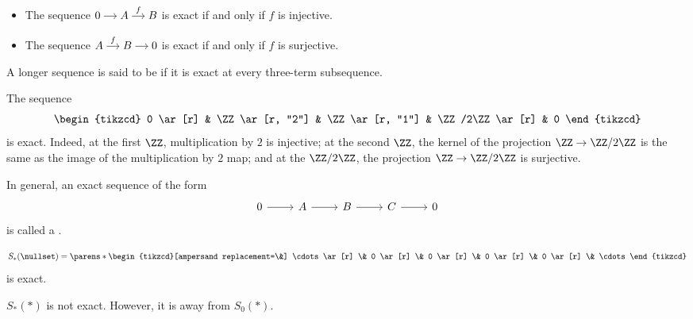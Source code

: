 \documentclass{standalone}
\begin{document}
\begin{example}
  \begin{itemize}[nosep]
    \item The sequence
      \(
        \begin{tikzcd}[cramped, sep=small]
          0 \ar[r] &
          A \ar[r, "f"] &
          B
        \end{tikzcd}
      \)
      is exact if and only if \(f\) is injective.
    \item The sequence
      \(
        \begin{tikzcd}[cramped, sep=small]
          A \ar[r, "f"] &
          B \ar[r] &
          0
        \end{tikzcd}
      \)
      is exact if and only if \(f\) is surjective.
  \end{itemize}
\end{example}

\begin{definition}
  A longer sequence is said to be  if it is exact at every
  three-term subsequence.
\end{definition}

\begin{example}
  The sequence
  \[
    \begin{tikzcd}
      0 \ar[r] &
      \ZZ \ar[r, "2"] &
      \ZZ \ar[r, "1"] &
      \ZZ/2\ZZ \ar[r] &
      0
    \end{tikzcd}
  \]
  is exact. Indeed, at the first \(\ZZ\), multiplication by \(2\) is injective;
  at the second \(\ZZ\), the kernel of the projection \(\ZZ \to \ZZ/2\ZZ\) is
  the same as the image of the multiplication by \(2\) map; and at
  the \(\ZZ/2\ZZ\), the projection \(\ZZ \to \ZZ/2\ZZ\) is surjective.

  In general, an exact sequence of the form
  \[
    \begin{tikzcd}
      0 \ar[r] &
      A \ar[r] &
      B \ar[r] &
      C \ar[r] &
      0
    \end{tikzcd}
  \]
  is called a .
\end{example}

\begin{example}
  \[
    S_*(\nullset) = \parens*{
      \begin{tikzcd}[ampersand replacement=\&]
        \cdots \ar[r] \&
        0 \ar[r] \&
        0 \ar[r] \&
        0 \ar[r] \&
        0 \ar[r] \&
        \cdots
      \end{tikzcd}
    }
  \]
  is exact.

  \(S_*(*)\) is not exact. However, it is away from \(S_0(*)\).
\end{example}
\end{document}
